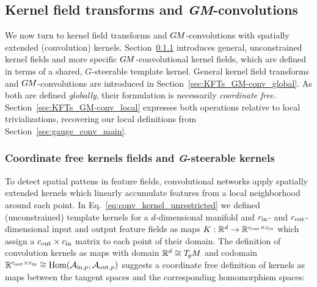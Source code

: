 

\subsection{Kernel field transforms and \textit{GM}-convolutions}
\label{sec:global_conv}

We now turn to kernel field transforms and $G\mkern-1.4muM$-convolutions with spatially extended (convolution) kernels.
Section~\ref{sec:kernel_fields} introduces general, unconstrained kernel fields and more specific $G\mkern-1.4muM$-convolutional kernel fields, which are defined in terms of a shared, $G$-steerable template kernel.
General kernel field transforms and $G\mkern-1.4muM$-convolutions are introduced in Section~\ref{sec:KFTs_GM-conv_global}.
As both are defined \emph{globally}, their formulation is necessarily \emph{coordinate free}.
Section~\ref{sec:KFTs_GM-conv_local} expresses both operations relative to local trivializations, recovering our local definitions from Section~\ref{sec:gauge_conv_main}.





\subsubsection[Kernel fields]{Coordinate free kernels fields and \textit{G}-steerable kernels}
\label{sec:kernel_fields}

To detect spatial pattens in feature fields, convolutional networks apply spatially extended kernels which linearly accumulate features from a local neighborhood around each point.
In Eq.~\eqref{eq:conv_kernel_unrestricted} we defined (unconstrained) template kernels for a $d$-dimensional manifold and ${c_\textup{in}}$- and ${c_\textup{out}}$-dimensional input and output feature fields as maps
$K: \mathbb{R}^d \to \mathbb{R}^{{c_\textup{out}}\times{c_\textup{in}}}$
which assign a ${c_\textup{out}}\times{c_\textup{in}}$ matrix to each point of their domain.
The definition of convolution kernels as maps with domain $\mathbb{R}^d\cong T_{\mkern-1.5mu p}\mkern-.5muM$ and codomain $\mathbb{R}^{{c_\textup{out}}\times{c_\textup{in}}}\cong \operatorname{Hom}(\mathcal{A}_{\textup{in},p},\mathcal{A}_{\textup{out},p})$ suggests a coordinate free definition of kernels
as maps between the tangent spaces and the corresponding homomorphism spaces:

